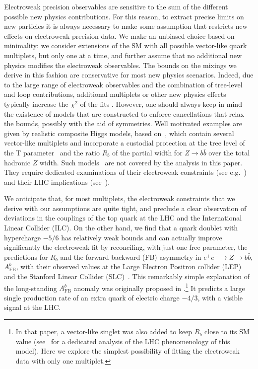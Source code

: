\documentclass[12pt,a4paper]{article}
\begin{document}
Electroweak precision observables are sensitive to the sum of the different possible new physics contributions. For this reason, to extract precise limits on new particles it is always necessary to make some assumption that restricts new effects on electroweak precision data. We make an unbiased choice based on minimality: we consider extensions of the SM with all possible vector-like quark multiplets, but only one at a time, and further assume that no additional new physics modifies the electroweak observables. The bounds on the mixings we derive in this fashion are conservative for most new physics scenarios. Indeed, due to the large range of electroweak observables and the combination of tree-level and loop contributions, additional multiplets or other new physics effects typically increase the $\chi^2$ of the fits \cite{delAguila:2011yd}. However, one should always keep in mind the existence of models that are constructed to enforce cancellations that relax the bounds, possibly with the aid of symmetries. Well motivated examples are given by realistic composite Higgs models, based on~\cite{Agashe:2004rs}, which contain several vector-like multiplets and incorporate a custodial protection at the tree level of the T parameter~\cite{Peskin:1990zt} and the ratio $R_b$ of the partial width for $Z \to b \bar b$ over the total hadronic $Z$ width. Such models~\cite{Agashe:2003zs,Agashe:2006at} are not covered by the analysis in this paper. They require dedicated examinations of their electroweak constraints (see e.g.~\cite{Anastasiou:2009rv}) and their LHC implications (see~\cite{Contino:2008hi,Mrazek:2009yu,DeSimone:2012fs}).

We anticipate that, for most multiplets, the electroweak constraints that we derive with our assumptions are quite tight, and preclude a clear observation of deviations in the couplings of the top quark at the LHC and the International Linear Collider (ILC). On the other hand, we find that a quark doublet with hypercharge $-5/6$ has relatively weak bounds and can actually improve significantly the electroweak fit by reconciling, with just one free parameter, the predictions for $R_b$ and the forward-backward (FB) asymmetry in $e^+ e^- \to Z \to b \bar b$, $A_\mathrm{FB}^b$, with their observed values at the Large Electron Positron collider (LEP) and the Stanford Linear Collider (SLC)~\cite{ALEPH:2005ab}. This remarkably simple explanation of the long-standing $A_\mathrm{FB}^b$ anomaly was originally proposed in \cite{Choudhury:2001hs}.\footnote{In that paper, a vector-like singlet was also added to keep $R_b$ close to its SM value (see~\cite{Kumar:2010vx} for a dedicated analysis of the LHC phenomenology of this model). Here we explore the simplest possibility of fitting the electroweak data with only one multiplet.} It predicts a large single production rate of an extra quark of electric charge $-4/3$, with a visible signal at the LHC.
\end{document}
